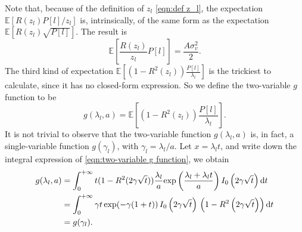 \documentclass[12pt,draftclsnofoot,journal,onecolumn]{IEEEtran}
\theoremstyle{nonumberplain}
\def \exp {\text{exp}}
\begin{document}
\begin{IEEEproof}
    Note that, because of the definition of $z_l$ \eqref{eqn:def z_l}, the expectation $\mathbb{E}\left[R(z_l)P[l]/z_l\right]$ is, intrinsically, of the same form as the expectation $\mathbb{E}\left[R(z_l) \sqrt{P[l]}\right]$. The result is
    \begin{equation}
        \mathbb{E}\left[\frac{R(z_l)}{z_l} P[l]\right] = \frac{A\sigma_v^2}{2}.
        \label{eqn:expectation_second_kind_2}
    \end{equation}
    The third kind of expectation $\mathbb{E}\left[(1-R^2(z_l))\frac{P[l]}{\lambda_l}\right]$ is the trickiest to calculate, since it has no closed-form expression. So we define the two-variable $g$ function to be 
    \begin{equation}
        g(\lambda_l, a) = \mathbb{E}\left[(1-R^2(z_l))\frac{P[l]}{\lambda_l}\right].
        \label{eqn:two-variable g function}
    \end{equation}
    It is not trivial to observe that the two-variable function $g(\lambda_l, a)$ is, in fact, a single-variable function $g(\gamma_l)$, with $\gamma_l=\lambda_l/a$. Let $x=\lambda_l t$, and write down the integral expression of \eqref{eqn:two-variable g function}, we obtain 
    \begin{equation}
        \begin{aligned}
        g(\lambda_l, a) & = \int_{0}^{+\infty} t(1-R^2(2\gamma\sqrt{t})) \frac{\lambda_l}{a} \exp\left(\frac{\lambda_l + \lambda_l t}{a}\right) I_0\left(2\gamma\sqrt{t}\right){\rm d}t \\
        & = \int_{0}^{+\infty}\gamma t \, \exp(-\gamma(1+t))\, I_0\left(2\gamma\sqrt{t}\right)\,\left(1-R^2\left(2\gamma\sqrt{t}\right)\right){\rm d}t \\
        & = g(\gamma_l).
        \end{aligned}
        \label{eqn:proof precise g function}
    \end{equation}
    

\end{IEEEproof}
\end{document}

